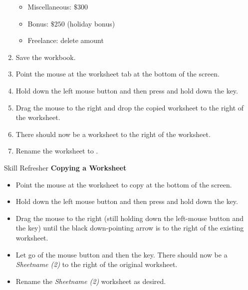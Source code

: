 \begin{enumbox}
\begin{enumerate}
		\begin{itemize}
			\item Miscellaneous: $ \$300 $
			\item Bonus: $ \$250 $ (holiday bonus)
			\item Freelance: delete amount
		\end{itemize}
		\item Save the  workbook.
		\item Point the mouse at the  worksheet tab at the bottom of the screen.
		\item Hold down the left mouse button and then press and hold down the  key. 
		\item Drag the mouse to the right and drop the copied worksheet to the right of the  worksheet.
		\item There should now be a  worksheet to the right of the  worksheet.
		\item Rename the  worksheet to .
	\end{enumerate}
\end{enumbox}

\begin{center}
	\begin{sklbox}{Skill Refresher}
		\textbf{Copying a Worksheet}
		\\
		\begin{itemize}
			\setlength{\itemsep}{0pt}
			\setlength{\parskip}{0pt}
			\setlength{\parsep}{0pt}
			
			\item Point the mouse at the worksheet to copy at the bottom of the screen.
			\item Hold down the left mouse button and then press and hold down the  key.
			\item Drag the mouse to the right (still holding down the left-mouse button and the  key) until the black down-pointing arrow is to the right of the existing worksheet.
			\item Let go of the mouse button and then the  key. There should now be a \textit{Sheetname (2)} to the right of the original worksheet.
			\item Rename the \textit{Sheetname (2)} worksheet as desired.
			
		\end{itemize}
	\end{sklbox}
\end{center}

